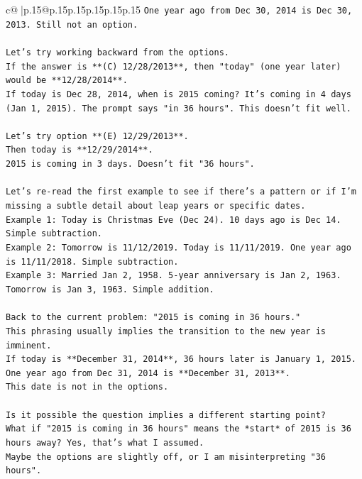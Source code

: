 \documentclass{article}
\begin{document}
{\begin{supertabular}{c@{$\;$}|p{.15\linewidth}@{}p{.15\linewidth}p{.15\linewidth}p{.15\linewidth}p{.15\linewidth}p{.15\linewidth}}
{{{\texttt{One year ago from Dec 30, 2014 is Dec 30, 2013. Still not an option.} \\
\\ 
\texttt{Let's try working backward from the options.} \\
\texttt{If the answer is **(C) 12/28/2013**, then "today" (one year later) would be **12/28/2014**.} \\
\texttt{If today is Dec 28, 2014, when is 2015 coming? It's coming in 4 days (Jan 1, 2015). The prompt says "in 36 hours". This doesn't fit well.} \\
\\ 
\texttt{Let's try option **(E) 12/29/2013**.} \\
\texttt{Then today is **12/29/2014**.} \\
\texttt{2015 is coming in 3 days. Doesn't fit "36 hours".} \\
\\ 
\texttt{Let's re{-}read the first example to see if there's a pattern or if I'm missing a subtle detail about leap years or specific dates.} \\
\texttt{Example 1: Today is Christmas Eve (Dec 24). 10 days ago is Dec 14. Simple subtraction.} \\
\texttt{Example 2: Tomorrow is 11/12/2019. Today is 11/11/2019. One year ago is 11/11/2018. Simple subtraction.} \\
\texttt{Example 3: Married Jan 2, 1958. 5{-}year anniversary is Jan 2, 1963. Tomorrow is Jan 3, 1963. Simple addition.} \\
\\ 
\texttt{Back to the current problem: "2015 is coming in 36 hours."} \\
\texttt{This phrasing usually implies the transition to the new year is imminent.} \\
\texttt{If today is **December 31, 2014**, 36 hours later is January 1, 2015.} \\
\texttt{One year ago from Dec 31, 2014 is **December 31, 2013**.} \\
\texttt{This date is not in the options.} \\
\\ 
\texttt{Is it possible the question implies a different starting point?} \\
\texttt{What if "2015 is coming in 36 hours" means the *start* of 2015 is 36 hours away? Yes, that's what I assumed.} \\
\texttt{Maybe the options are slightly off, or I am misinterpreting "36 hours".} \\
}}}
\end{supertabular}}
\end{document}
